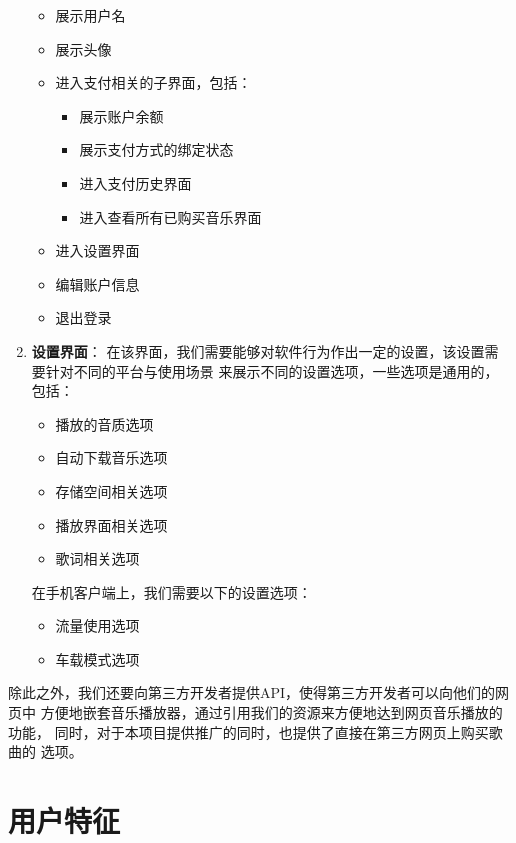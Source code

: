 \begin{enumerate}
        \begin{itemize}
            \item 展示用户名
            \item 展示头像
            \item 进入支付相关的子界面，包括：
            \begin{itemize}
                \item 展示账户余额
                \item 展示支付方式的绑定状态
                \item 进入支付历史界面
                \item 进入查看所有已购买音乐界面
            \end{itemize}
            \item 进入设置界面
            \item 编辑账户信息
            \item 退出登录
        \end{itemize}
    \item \textbf{设置界面}：
        在该界面，我们需要能够对软件行为作出一定的设置，该设置需要针对不同的平台与使用场景
            来展示不同的设置选项，一些选项是通用的，包括：
            \begin{itemize}
                \item 播放的音质选项
                \item 自动下载音乐选项
                \item 存储空间相关选项
                \item 播放界面相关选项
                \item 歌词相关选项
            \end{itemize}
            在手机客户端上，我们需要以下的设置选项：
            \begin{itemize}
                \item 流量使用选项
                \item 车载模式选项
            \end{itemize}
\end{enumerate}

除此之外，我们还要向第三方开发者提供API，使得第三方开发者可以向他们的网页中
    方便地嵌套音乐播放器，通过引用我们的资源来方便地达到网页音乐播放的功能，
    同时，对于本项目提供推广的同时，也提供了直接在第三方网页上购买歌曲的
    选项。    

\section{用户特征}

